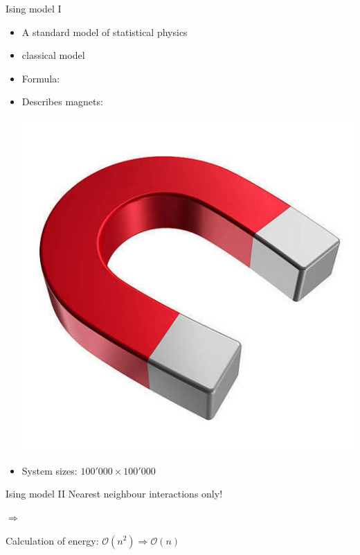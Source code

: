 \documentclass{beamer}
\begin{document}
\begin{frame}{Ising model I}
\begin{itemize}
    \item A standard model of statistical physics \pause
    \item classical model \pause
    \item Formula:
        \ising \pause
    \item Describes magnets:\\
        \begin{minipage}{0.3\paperwidth}\end{minipage}
        \hfill
        \begin{minipage}{0.3\paperwidth}\includegraphics[keepaspectratio=true, width=0.3\paperwidth]{images/magnet.jpg}\end{minipage} \pause
    \item System sizes: $100'000 \times 100'000$
\end{itemize}
\end{frame}

\begin{frame}{Ising model II}
    Nearest neighbour interactions only!
    \ising \pause
    \vspace{1cm}
    \begin{minipage}{0.3\paperwidth}\end{minipage}
    {\Huge$\Rightarrow$}
    \begin{minipage}{0.2\paperwidth}\end{minipage} \pause
    
    Calculation of energy: $\mathcal{O}\left( n^2 \right) \Rightarrow \mathcal{O}\left( n \right)$
\end{frame}
\end{document}
